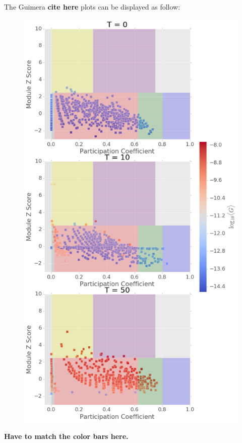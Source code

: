 \documentclass[%
 reprint,
 amsmath,amssymb,
 aps,
]{revtex4-2}
\begin{document}
The Guimera \textbf{cite here} plots can be displayed as follow:
 
\begin{figure}[h]
	\centering
	\includegraphics[width=1\linewidth]{figure/guimera_combine}
	\caption{}
	\label{fig:guimera_combine}
\end{figure}

\textbf{Have to match the color bars here.}
\end{document}
